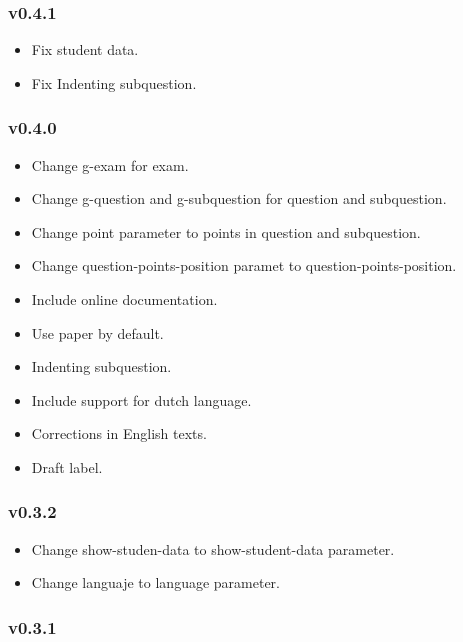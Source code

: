 \subsubsection{v0.4.1}\label{v0.4.1}

\begin{itemize}
\tightlist
\item
  Fix student data.
\item
  Fix Indenting subquestion.
\end{itemize}

\subsubsection{v0.4.0}\label{v0.4.0}

\begin{itemize}
\tightlist
\item
  Change g-exam for exam.
\item
  Change g-question and g-subquestion for question and subquestion.
\item
  Change point parameter to points in question and subquestion.
\item
  Change question-points-position paramet to question-points-position.
\item
  Include online documentation.
\item
  Use paper by default.
\item
  Indenting subquestion.
\item
  Include support for dutch language.
\item
  Corrections in English texts.
\item
  Draft label.
\end{itemize}

\subsubsection{v0.3.2}\label{v0.3.2}

\begin{itemize}
\tightlist
\item
  Change show-studen-data to show-student-data parameter.
\item
  Change languaje to language parameter.
\end{itemize}

\subsubsection{v0.3.1}\label{v0.3.1}

